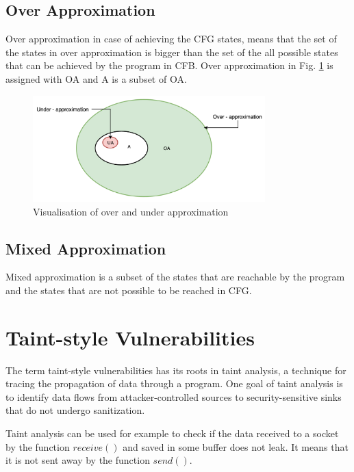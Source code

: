 \documentclass[a4paper, 12pt, journal, onecolumn]{IEEEtran}
\begin{document}
\subsection{Over Approximation}

Over approximation in case of achieving the CFG states, means that the set of the states in over approximation is bigger than the set of the all possible states that can be achieved by the program in CFB. Over approximation in Fig. \ref{fig:approximation} is assigned with OA and A is a subset of OA. \cite{a4}

\begin{figure}[ht]
    \centering
    \captionsetup{justification=centering}
    \includegraphics[width=0.8\textwidth]{approximation.png}
    \caption{Visualisation of over and under approximation \cite{a3} }
    \label{fig:approximation}
\end{figure}

\subsection{Mixed Approximation}

Mixed approximation is a subset of the states that are reachable by the program and the states that are not possible to be reached in CFG.   

\section{Taint-style Vulnerabilities}

The term taint-style vulnerabilities has its roots in taint analysis, a technique for tracing the propagation of data through a program. One goal of taint analysis is to identify data flows from attacker-controlled sources to security-sensitive sinks that do not undergo sanitization.\cite{a5} \cite{a6}

Taint analysis can be used for example to check if the data received to a socket by the function $receive()$ and saved in some buffer does not leak. It means that it is not sent away by the function $send()$.
\end{document}
